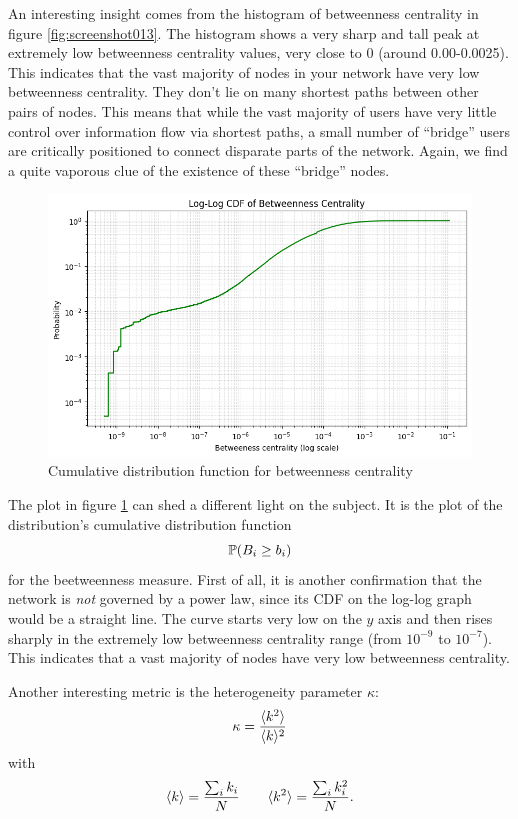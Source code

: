 \documentclass[12pt]{article}
\begin{document}
An interesting insight comes from the histogram of betweenness centrality in figure \ref{fig:screenshot013}.
The histogram shows a very sharp and tall peak at extremely low betweenness centrality values, very close to 0 (around 0.00-0.0025). This indicates that the vast majority of nodes in your network have very low betweenness centrality. They don't lie on many shortest paths between other pairs of nodes. This means that while the vast majority of users have very little control over information flow via shortest paths, a small number of ``bridge'' users are critically positioned to connect disparate parts of the network. Again, we find a quite vaporous clue of the existence of these ``bridge'' nodes.
\begin{figure}[h]
	\centering
	\includegraphics[width=0.6\linewidth]{screenshot014}
	\caption{Cumulative distribution function for betweenness centrality}
	\label{fig:screenshot014}
\end{figure}
The plot in figure \ref{fig:screenshot014} can shed a different light on the subject. It is the plot of the distribution's cumulative distribution function
\begin{equation*}
	\mathbb{P}(B_{i}\geq b_{i})
\end{equation*}
for the beetweenness measure. First of all, it is another confirmation that the network is \textit{not} governed by a power law, since its CDF on the log-log graph would be a straight line. The curve starts very low on the $y$ axis and then rises sharply in the extremely low betweenness centrality range (from $10^{-9}$ to $10^{-7}$). This indicates that a vast majority of nodes have very low betweenness centrality.\par
Another interesting metric is the heterogeneity parameter $\kappa$:
\begin{equation*}
	\kappa=\frac{\langle k^{2}\rangle}{\langle k\rangle^{2}}
\end{equation*}
with
\begin{equation*}
	\langle k\rangle=\frac{\sum_{i}k_{i}}{N}\qquad\langle k^{2}\rangle=\frac{\sum_{i}k^{2}_{i}}{N}.
\end{equation*}
\end{document}
